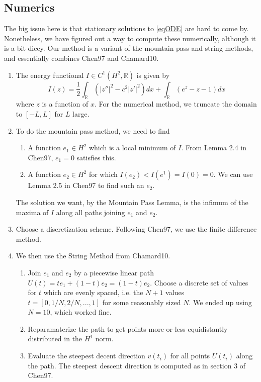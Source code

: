 \documentclass[12pt]{article}
\def\R{{\mathbb R}}
\begin{document}
\subsection{Numerics}

The big issue here is that stationary solutions to \eqref{eqODE} are hard to come by. Nonetheless, we have figured out a way to compute these numerically, although it is a bit dicey. Our method is a variant of the mountain pass and string methods, and essentially combines Chen97 and Chamard10.

\begin{enumerate}
	\item The energy functional $I \in C^1(H^2, \R)$ is given by
	\begin{equation}
	I(z) = \frac{1}{2} \int_\R (|z''|^2 - c^2 |z'|^2)dx 
	+ \int_\R (e^z - z - 1) dx
	\end{equation}
	where $z$ is a function of $x$. For the numerical method, we truncate the domain to $[-L, L]$ for $L$ large.
	\item To do the mountain pass method, we need to find
	\begin{enumerate}
		\item A function $e_1 \in H^2$ which is a local minimum of $I$. From Lemma 2.4 in Chen97, $e_1 = 0$ satisfies this.
		\item A function $e_2 \in H^2$ for which $I(e_2) < I(e^1) = I(0) = 0$. We can use Lemma 2.5 in Chen97 to find such an $e_2$. 
	\end{enumerate} 
	The solution we want, by the Mountain Pass Lemma, is the infimum of the maxima of $I$ along all paths joining $e_1$ and $e_2$.
	\item Choose a discretization scheme. Following Chen97, we use the finite difference method.
	\item We then use the String Method from Chamard10.
	\begin{enumerate}
		\item Join $e_1$ and $e_2$ by a piecewise linear path $U(t) = t e_1 + (1-t) e_2 = (1-t)e_2$. Choose a discrete set of values for $t$ which are evenly spaced, i.e. the $N+1$ values $t = [0, 1/N, 2/N, ..., 1]$ for some reasonably sized $N$. We ended up using $N = 10$, which worked fine.
		\item Reparamaterize the path to get points more-or-less equidistantly distributed in the $H^1$ norm.
		\item Evaluate the steepest decent direction $v(t_i)$ for all points $U(t_i)$ along the path. The steepest descent direction is computed as in section 3 of Chen97.

\end{enumerate}
\end{enumerate}
\end{document}
